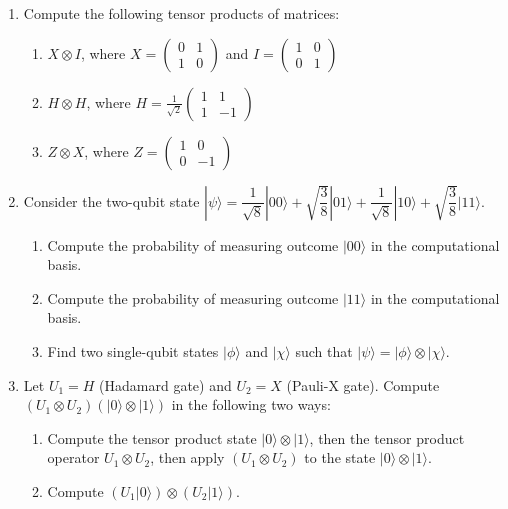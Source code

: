 \documentclass[12pt]{article}
\begin{document}
\begin{enumerate}
\item Compute the following tensor products of matrices:
\begin{enumerate}
    \item $X \otimes I$, where $X = \begin{pmatrix} 0 & 1 \\ 1 & 0 \end{pmatrix}$ and $I = \begin{pmatrix} 1 & 0 \\ 0 & 1 \end{pmatrix}$
    \item $H \otimes H$, where $H = \frac{1}{\sqrt{2}}\begin{pmatrix} 1 & 1 \\ 1 & -1 \end{pmatrix}$
    \item $Z \otimes X$, where $Z = \begin{pmatrix} 1 & 0 \\ 0 & -1 \end{pmatrix}$
\end{enumerate}

\item Consider the two-qubit state $|\psi\rangle = \dfrac{1}{\sqrt{8}}|00\rangle + \sqrt{\dfrac{3}{8}}|01\rangle + \dfrac{1}{\sqrt{8}}|10\rangle + \sqrt{\dfrac{3}{8}}|11\rangle$.
\begin{enumerate}
    \item Compute the probability of measuring outcome $|00\rangle$ in the computational basis.
    \item Compute the probability of measuring outcome $|11\rangle$ in the computational basis.
    \item Find two single-qubit states $|\phi\rangle$ and $|\chi\rangle$ such that $|\psi\rangle = |\phi\rangle \otimes |\chi\rangle$.
\end{enumerate}

\item Let $U_1 = H$ (Hadamard gate) and $U_2 = X$ (Pauli-X gate). Compute $(U_1 \otimes U_2)(|0\rangle \otimes |1\rangle)$ in the following two ways:
\begin{enumerate}
    \item Compute the tensor product state $|0\rangle \otimes |1\rangle$, then the tensor product operator $U_1 \otimes U_2$, then apply $(U_1 \otimes U_2)$ to the state $|0\rangle \otimes |1\rangle$.
    \item Compute $(U_1|0\rangle) \otimes (U_2|1\rangle).$
\end{enumerate}
\end{enumerate}
\end{document}
